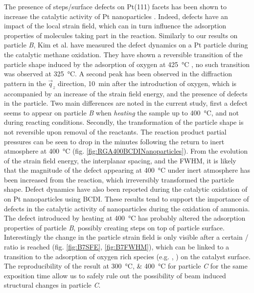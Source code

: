 The presence of steps/surface defects on Pt(111) facets has been shown to increase the catalytic activity of Pt nanoparticles \parencite{Segner1984, Chen2012}.
Indeed, defects have an impact of the local strain field, which can in turn influence the adsorption properties of molecules taking part in the reaction.
Similarly to our results on particle \textit{B}, Kim et al. \parencite*{Kim2019} have measured the defect dynamics on a Pt particle during the catalytic methane oxidation.
They have shown a reversible transition of the particle shape induced by the adsorption of oxygen at \qty{425}{\degreeCelsius}
, no such transition was observed at \qty{325}{\degreeCelsius}.
A second peak has been observed in the diffraction pattern in the $\vec{q}_z$ direction, \qty{10}{\minute} after the introduction of oxygen, which is accompanied by an increase of the strain field energy, and the presence of defects in the particle.
Two main differences are noted in the current study, first a defect seems to appear on particle \textit{B} when \textit{heating} the sample up to \qty{400}{\degreeCelsius}, and not during reacting conditions.
Secondly, the transformation of the particle shape is not reversible upon removal of the reactants.
The reaction product partial pressures can be seen to drop in the minutes following the return to inert atmosphere at \qty{400}{\degreeCelsius} (fig. \ref{fig:RGA400BCDINanoparticles}).
From the evolution of the strain field energy, the interplanar spacing, and the FWHM, it is likely that the magnitude of the defect appearing at \qty{400}{\degreeCelsius} under inert atmosphere has been increased from the reaction, which irreversibly transformed the particle shape.
Defect dynamics have also been reported during the catalytic oxidation of  on Pt nanoparticles \parencite{Carnis2021b} using BCDI.
These results tend to support the importance of defects in the catalytic activity of nanoparticles during the oxidation of ammonia.
The defect introduced by heating at \qty{400}{\degreeCelsius} has probably altered the adsorption properties of particle \textit{B}, possibly creating steps on top of particle surface.
Interestingly the change in the particle strain field is only visible after a certain / ratio is reached (fig. \ref{fig:B7SFE}, \ref{fig:B7FWHM}), which can be linked to a transition to the adsorption of oxygen rich species (e.g. , ) on the catalyst surface.
The reproducibility of the result at \qtylist{300;400}{\degreeCelsius} for particle \textit{C} for the same exposition time allow us to safely rule out the possibility of beam induced structural changes in particle \textit{C}.

